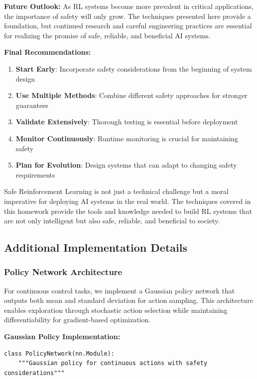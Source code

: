 \documentclass[12pt]{article}
\begin{document}
{{{{\textbf{Future Outlook:}
As RL systems become more prevalent in critical applications, the importance of safety will only grow. The techniques presented here provide a foundation, but continued research and careful engineering practices are essential for realizing the promise of safe, reliable, and beneficial AI systems.

\textbf{Final Recommendations:}
\begin{enumerate}
\item \textbf{Start Early}: Incorporate safety considerations from the beginning of system design
\item \textbf{Use Multiple Methods}: Combine different safety approaches for stronger guarantees
\item \textbf{Validate Extensively}: Thorough testing is essential before deployment
\item \textbf{Monitor Continuously}: Runtime monitoring is crucial for maintaining safety
\item \textbf{Plan for Evolution}: Design systems that can adapt to changing safety requirements
\end{enumerate}

Safe Reinforcement Learning is not just a technical challenge but a moral imperative for deploying AI systems in the real world. The techniques covered in this homework provide the tools and knowledge needed to build RL systems that are not only intelligent but also safe, reliable, and beneficial to society.

\subsection{Additional Implementation Details}

\subsubsection{Policy Network Architecture}

For continuous control tasks, we implement a Gaussian policy network that outputs both mean and standard deviation for action sampling. This architecture enables exploration through stochastic action selection while maintaining differentiability for gradient-based optimization.

\textbf{Gaussian Policy Implementation:}
\begin{verbatim}
class PolicyNetwork(nn.Module):
    """Gaussian policy for continuous actions with safety considerations"""
    

\end{verbatim}}}}}
\end{document}
